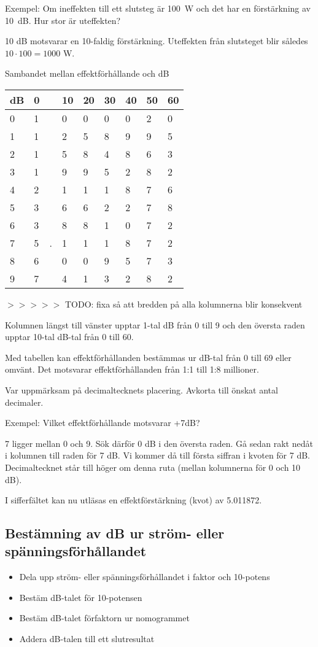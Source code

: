 Exempel: Om ineffekten till ett slutsteg är 100~W och det har en
förstärkning av 10~dB.  Hur stor är uteffekten?

10 dB motsvarar en 10-faldig förstärkning.  Uteffekten från slutsteget
blir således \(10 \cdot 100 = 1000\) W.

Sambandet mellan effektförhållande och dB

\begin{tabular}{l|llllllll}
  dB & 0 & & 10 & 20 & 30 & 40 & 50 & 60 \\
  \hline
  0  & 1 & & 0  & 0  & 0  & 0  & 2  & 0 \\
  1  & 1 & & 2  & 5  & 8  & 9  & 9  & 5 \\
  2  & 1 & & 5  & 8  & 4  & 8  & 6  & 3 \\
  3  & 1 & & 9  & 9  & 5  & 2  & 8  & 2 \\
  4  & 2 & & 1  & 1  & 1  & 8  & 7  & 6 \\
  5  & 3 & & 6  & 6  & 2  & 2  & 7  & 8 \\
  6  & 3 & & 8  & 8  & 1  & 0  & 7  & 2 \\
  7  & 5 &.& 1  & 1  & 1  & 8  & 7  & 2 \\
  8  & 6 & & 0  & 0  & 9  & 5  & 7  & 3 \\
  9  & 7 & & 4  & 1  & 3  & 2  & 8  & 2 \\
\end{tabular}
$>>>>>$ TODO: fixa så att bredden på alla kolumnerna blir konsekvent

Kolumnen längst till vänster upptar 1-tal dB från 0 till 9 och den
översta raden upptar 10-tal dB-tal från 0 till 60.

Med tabellen kan effektförhållanden bestämmas ur dB-tal från 0 till 69
eller omvänt.  Det motsvarar effektförhållanden från 1:1 till 1:8
millioner.

Var uppmärksam på decimaltecknets placering. Avkorta till önskat antal decimaler.

Exempel: Vilket effektförhållande motsvarar +7dB?

7 ligger mellan 0 och 9. Sök därför 0 dB i den översta raden. Gå sedan
rakt nedåt i kolumnen till raden för 7 dB. Vi kommer då till första
siffran i kvoten för 7 dB. Decimaltecknet står till höger om denna
ruta (mellan kolumnerna för 0 och 10 dB).

I sifferfältet kan nu utläsas en effektförstärkning (kvot) av
5.011872.

\subsection{Bestämning av dB ur ström- eller spänningsförhållandet}
\begin{itemize}
\item Dela upp ström- eller spänningsförhållandet i faktor och 10-potens
\item Bestäm dB-talet för 10-potensen
\item Bestäm dB-talet förfaktorn ur nomogrammet
\item Addera dB-talen till ett slutresultat
\end{itemize}

